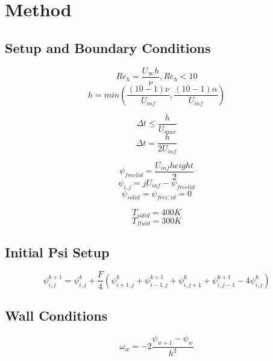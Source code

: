 \section{Method}


\subsection{Setup and Boundary Conditions}
\begin{equation}
    Re_h = \frac{U_\infty h}{\nu}, Re_h < 10
\end{equation}
\begin{equation}
    h = min\left( \frac{(10 - 1) \nu}{U_{inf}}, \frac{(10 - 1) \alpha}{U_{inf}} \right)
\end{equation}

\begin{equation}
    \Delta t \leq \frac{h}{U_{max}}
\end{equation}
\begin{equation}
    \Delta t = \frac{h}{2 U_{inf}}
\end{equation}

\begin{equation}
    \psi_{free lid} = \frac{U_{inf} height}{2}
\end{equation}
\begin{equation}
    \psi_{i, j} = j U_{inf} - \psi_{free lid}
\end{equation}
\begin{equation}
    \psi_{solid} = \psi_{free ;id} = 0
\end{equation}

\begin{equation}
    T_{solid} = 400K
\end{equation}
\begin{equation}
    T_{fluid} = 300K
\end{equation}


\subsection{Initial Psi Setup}
\begin{equation}
    \psi_{i, j}^{k + 1} = \psi_{i, j}^{k} + \frac{F}{4} \left( \psi_{i + 1, j}^{k} + \psi_{i - 1, j}^{k + 1} + \psi_{i, j + 1}^{k} + \psi_{i, j - 1}^{k + 1} - 4 \psi_{i, j}^{k} \right)
\end{equation}

\subsection{Wall Conditions}
\begin{equation}
    \omega_{w} = -2\frac{\psi_{w + 1} - \psi_{w}}{h^2}
\end{equation}


